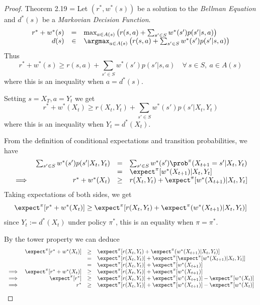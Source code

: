 \documentclass[11pt,a4paper]{article}
\begin{document}
  \begin{proof}{Theorem 2.19}
    \everymath={\displaystyle}
    Let $(r^*,w^*(s))$ be a solution to the \textit{Bellman Equation} and $d^*(s)$ be a \textit{Markovian Decision Function}.
    \[\begin{array}{rcl}
      r^*+w^*(s)&=&\max_{a\in A(s)}\left(r(s,a)+\sum_{s'\in S}w^*(s')p(s'|s,a)\right)\\
      d(s)&\in&\argmax_{a\in A(s)}\left(r(s,a)+\sum_{s'\in S}w^*(s')p(s'|s,a)\right)
    \end{array}\]
    Thus
    \[ r^*+w^*(s)\geq r(s,a)+\sum_{s'\in S}w^*(s')p(s'|s,a)\quad\forall\ s\in S,\ a\in A(s) \]
    where this is an inequality when $a=d^*(s)$.
    \par Setting $s=X_T,a=Y_t$ we get
    \[ r^*+w^*(X_t)\geq r(X_t,Y_t)+\sum_{s'\in S}w^*(s')p(s'|X_t,Y_t)\]
    where this is an inequality when $Y_t=d^*(X_t)$.
    \par From the definition of conditional expectations and transition probabilities, we have
    \[\begin{array}{rrcl}
      &\sum_{s'\in S}w^*(s')p(s'|X_t,Y_t)&=&\sum_{s'\in S}w^*(s')\prob^\pi(X_{t+1}=s'|X_t,Y_t)\\
      &&=&\expect^\pi[w^*(X_{t+1})|X_t,Y_t]\\
      \implies&r^*+w^*(X_t)&\geq&r(X_t,Y_t)+\expect^\pi[w^*(X_{t+1})|X_t,Y_t]
    \end{array}\]
    Taking expectations of both sides, we get
    \[ \expect^\pi[r^*+w^*(X_t)]\geq\expect^\pi[r(X_t,Y_t)+\expect^\pi(w^*(X_{t+1})|X_t,Y_t)] \]
    since $Y_t:=d^*(X_t)$ under policy $\pi^*$, this is an equality when $\pi=\pi^*$.
    \par By the tower property we can deduce
    \[\begin{array}{rrcl}
      &\expect^\pi[r^*+w^*(X_t)]&\geq&\expect^\pi[r(X_t,Y_t)+\expect^\pi(w^*(X_{t+1})|X_t,Y_t)]\\
      &&=&\expect^\pi[r(X_t,Y_t)]+\expect^\pi[\expect^\pi[w^*(X_{t+1})|X_t,Y_t]]\\
      &&=&\expect^\pi[r(X_t,Y_t)]+\expect^\pi[w^*(X_{t+1})]\\
      \implies&\expect^\pi[r^*+w^*(X_t)]&\geq&\expect^\pi[r(X_t,Y_t)]+\expect^\pi[w^*(X_{t+1})]\\
      \implies&\expect^\pi[r^*]&\geq&\expect^\pi[r(X_t,Y_t)]+\expect^\pi[w^*(X_{t+1})]-\expect^\pi[w^*(X_t)]\\
      \implies&r^*&\geq&\expect^\pi[r(X_t,Y_t)]+\expect^\pi[w^*(X_{t+1})]-\expect^\pi[w^*(X_t)]\\

\end{array}\]
\end{proof}
\end{document}
